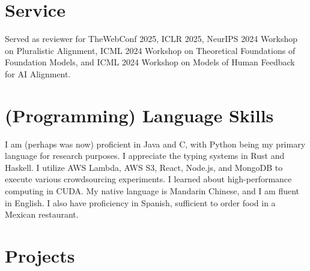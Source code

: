 \documentclass[11pt,letterpaper]{report}
\begin{document}
    \section*{Service}
    Served as reviewer for TheWebConf 2025, ICLR 2025, NeurIPS 2024 Workshop on Pluralistic Alignment, ICML 2024 Workshop on Theoretical Foundations of Foundation Models, and ICML 2024 Workshop on Models of Human Feedback for AI Alignment.

    \section*{(Programming) Language Skills}

    I am (perhaps was now) proficient in Java and C, with Python being my primary language for research purposes. I appreciate the typing systems in Rust and Haskell. I utilize AWS Lambda, AWS S3, React, Node.js, and MongoDB to execute various crowdsourcing experiments. I learned about high-performance computing in CUDA. My native language is Mandarin Chinese, and I am fluent in English. I also have proficiency in Spanish, sufficient to order food in a Mexican restaurant.

    \section*{Projects}
\end{document}
